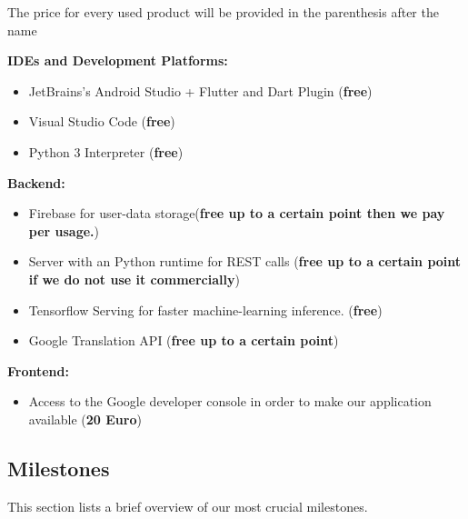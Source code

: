 \documentclass[12pt]{article}
\theoremstyle{definition}
\begin{document}
    The price for every used product will be provided in the parenthesis after the name
    
    {\bf IDEs and Development Platforms:}
    
    \begin{itemize}
        \item JetBrains's Android Studio + Flutter and Dart Plugin ({\bf free})
        \item Visual Studio Code ({\bf free}) 
        \item Python 3 Interpreter ({\bf free})
    \end{itemize}
    
    {\bf Backend:}
    \begin{itemize}
        \item Firebase for user-data storage({\bf free up to a certain point then we pay per usage.})
        \item Server with an Python runtime for REST calls ({\bf free up to a certain point if we do not use it commercially})
        \item Tensorflow Serving for faster machine-learning inference. ({\bf free})
        \item Google Translation API ({\bf free up to a certain point})
    \end{itemize}
    
    {\bf Frontend:}
    \begin{itemize}
        \item Access to the Google developer console in order to make our application available ({\bf 20 Euro})
    \end{itemize}
    
\pagebreak
    
   
\subsection{Milestones}

This section lists a brief overview of our most crucial milestones.
\end{document}
